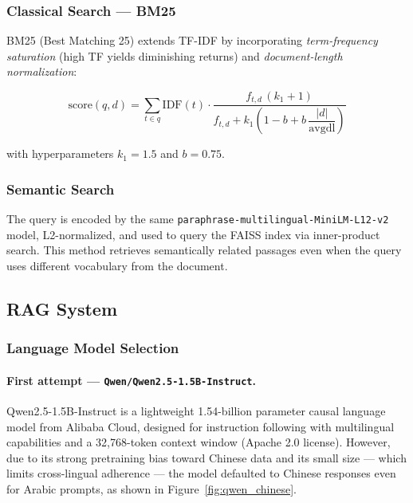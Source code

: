 \subsubsection{Classical Search --- BM25}

BM25 (Best Matching 25) extends TF-IDF by incorporating \emph{term-frequency saturation} (high TF yields diminishing returns) and \emph{document-length normalization}:

\begin{equation}
  \text{score}(q, d) = \sum_{t \in q} \text{IDF}(t) \cdot \frac{f_{t,d}\,(k_1+1)}{f_{t,d} + k_1\!\left(1 - b + b\,\dfrac{|d|}{\text{avgdl}}\right)}
\end{equation}

with hyperparameters $k_1 = 1.5$ and $b = 0.75$.

\subsubsection{Semantic Search}

The query is encoded by the same \texttt{paraphrase-multilingual-MiniLM-L12-v2} model, L2-normalized, and used to query the FAISS index via inner-product search. This method retrieves semantically related passages even when the query uses different vocabulary from the document.

\subsection{RAG System}

\subsubsection{Language Model Selection}

\paragraph{First attempt --- \texttt{Qwen/Qwen2.5-1.5B-Instruct}.}
Qwen2.5-1.5B-Instruct is a lightweight 1.54-billion parameter causal language model from Alibaba Cloud, designed for instruction following with multilingual capabilities and a 32,768-token context window (Apache 2.0 license). However, due to its strong pretraining bias toward Chinese data and its small size --- which limits cross-lingual adherence --- the model defaulted to Chinese responses even for Arabic prompts, as shown in Figure~\ref{fig:qwen_chinese}.

